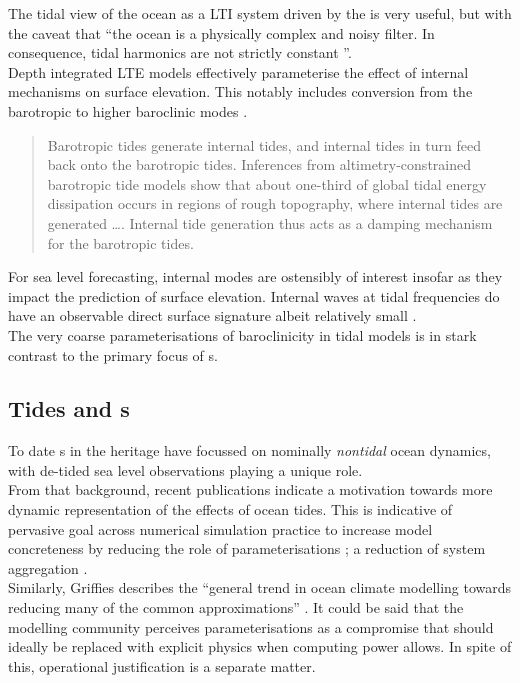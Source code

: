 The tidal view of the ocean as a LTI system driven by the \ATGP{} is very useful, but with the caveat that ``the ocean is a physically complex and noisy filter.  In consequence, tidal harmonics are not strictly constant \citep[197]{Ray:2010jm}''.\\

Depth integrated LTE models effectively parameterise the effect of internal mechanisms on surface elevation.  This notably includes conversion from the barotropic to higher baroclinic modes \cite[pp121] {gill1982atmosphere}. \\
\begin{quotation}
Barotropic tides generate internal tides, and internal tides in turn feed back onto the barotropic tides. Inferences from altimetry-constrained barotropic tide models show that about one-third of global tidal energy dissipation occurs in regions of rough topography, where internal tides are generated \dots{}. Internal tide generation thus acts as a damping mechanism for the barotropic tides.\citep[pp22]{Arbic:hy}
\end{quotation}

For sea level forecasting, internal modes are ostensibly of interest insofar as they impact the prediction of surface elevation.  Internal waves at tidal frequencies do have an observable direct surface signature albeit relatively small \cite{Ray:2011tj}.\\


The very coarse parameterisations of baroclinicity in tidal models is in stark contrast to the primary focus of \OGCM{}s.   



\subsection{Tides and \OGCM{}s}
\label{S:tides_ogcm}
To date \OGCM{}s in the \GODAE{} heritage have focussed on nominally \emph{nontidal} ocean dynamics, with de-tided sea level observations playing a unique role.\\


From that background, recent publications indicate a motivation towards more dynamic representation of the effects of ocean tides.   This is indicative of pervasive goal across numerical simulation practice to increase model concreteness by reducing the role of parameterisations \cite[section 5.3]{Petersen:2012tr}; a reduction of system aggregation \citep{Stevens:2001kb}.\\
Similarly, Griffies describes the ``general trend in ocean climate modelling towards reducing many of the common approximations'' \citep[pp20] {Griffies:2004vs}.
It could be said that the modelling community perceives parameterisations as a compromise that should ideally be replaced with explicit physics when computing power allows.  In spite of this, operational justification is a separate matter.



